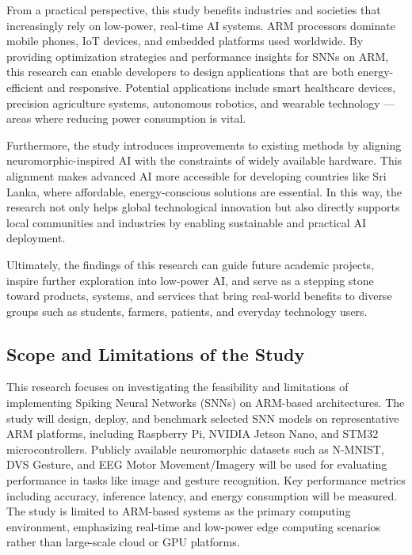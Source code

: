From a practical perspective, this study benefits industries and societies that increasingly rely on low-power, real-time AI systems. ARM processors dominate mobile phones, IoT devices, and embedded platforms used worldwide. By providing optimization strategies and performance insights for SNNs on ARM, this research can enable developers to design applications that are both energy-efficient and responsive. Potential applications include smart healthcare devices, precision agriculture systems, autonomous robotics, and wearable technology — areas where reducing power consumption is vital.

Furthermore, the study introduces improvements to existing methods by aligning neuromorphic-inspired AI with the constraints of widely available hardware. This alignment makes advanced AI more accessible for developing countries like Sri Lanka, where affordable, energy-conscious solutions are essential. In this way, the research not only helps global technological innovation but also directly supports local communities and industries by enabling sustainable and practical AI deployment.

Ultimately, the findings of this research can guide future academic projects, inspire further exploration into low-power AI, and serve as a stepping stone toward products, systems, and services that bring real-world benefits to diverse groups such as students, farmers, patients, and everyday technology users.
 

\subsection{Scope and Limitations of the Study}
This research focuses on investigating the feasibility and limitations of implementing Spiking Neural Networks (SNNs) on ARM-based architectures. The study will design, deploy, and benchmark selected SNN models on representative ARM platforms, including Raspberry Pi, NVIDIA Jetson Nano, and STM32 microcontrollers. Publicly available neuromorphic datasets such as N-MNIST, DVS Gesture, and EEG Motor Movement/Imagery will be used for evaluating performance in tasks like image and gesture recognition. Key performance metrics including accuracy, inference latency, and energy consumption will be measured. The study is limited to ARM-based systems as the primary computing environment, emphasizing real-time and low-power edge computing scenarios rather than large-scale cloud or GPU platforms.

